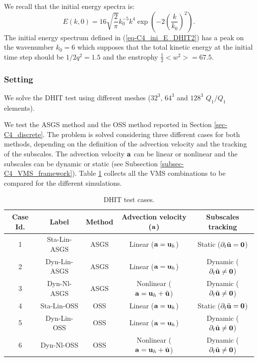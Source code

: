 We recall that the initial energy spectra is:
\begin{equation}
\label{eq-C4_ini_E_DHIT2}
E(k,0)=16\sqrt{\frac{2}{\pi}}k_0^{-5}k^4\exp\left(-2\left(\frac{k}{k_0}\right)^2\right).
\end{equation}
The initial energy spectrum defined in (\ref{eq-C4_ini_E_DHIT2}) has a peak on the wavenumber $k_0=6$ which supposes that the total kinetic energy at the initial time step should be $1/2q^2=1.5$ and the enstrophy $\frac{1}{2}<w^2>=67.5$.

\subsubsection{Setting}
\label{subsubsec-C4_DHIT_setting}
We solve the DHIT test using different meshes ($32^3$, $64^3$ and $128^3$ $Q_1/Q_1$ elements). 

We test the ASGS method and the OSS method reported in Section \ref{sec-C4_discrete}. The problem is solved considering three different cases for both methods, depending on the definition of the advection velocity and the tracking of the subscales. The advection velocity ${\bf a}$ can be linear or nonlinear and the subscales can be dynamic or static (see Subsection \ref{subsec-C4_VMS_framework}). Table \ref{table:DHIT_cases} collects all the VMS combinations to be compared for the different simulations.

\begin{table}[h]
\centering
\begin{tabular}{ccccc}
\toprule
Case Id.&Label&Method&Advection velocity (${\bf a}$)&Subscales tracking\\
\midrule
\midrule
1&Sta-Lin-ASGS&ASGS&Linear (${\bf a}={\bf u}_h$)&Static ($\partial_t\tilde{{\bf u}} = {\bf 0}$)\\
2&Dyn-Lin-ASGS&ASGS&Linear (${\bf a}={\bf u}_h$)&Dynamic ($\partial_t\tilde{{\bf u}} \not = {\bf 0}$)\\
3&Dyn-Nl-ASGS&ASGS&Nonlinear (${\bf a}={\bf u}_h+\tilde{{\bf u}}$)&Dynamic ($\partial_t\tilde{{\bf u}} \not = {\bf 0}$)\\
\midrule
4&Sta-Lin-OSS&OSS&Linear (${\bf a}={\bf u}_h$)&Static ($\partial_t\tilde{{\bf u}} = {\bf 0}$)\\
5&Dyn-Lin-OSS&OSS&Linear (${\bf a}={\bf u}_h$)&Dynamic ($\partial_t\tilde{{\bf u}} \not = {\bf 0}$)\\
6&Dyn-Nl-OSS&OSS&Nonlinear (${\bf a}={\bf u}_h+\tilde{{\bf u}}$)&Dynamic ($\partial_t\tilde{{\bf u}} \not = {\bf 0}$)\\
\bottomrule
\end{tabular}
\caption{DHIT test cases.}
\label{table:DHIT_cases}
\end{table}


